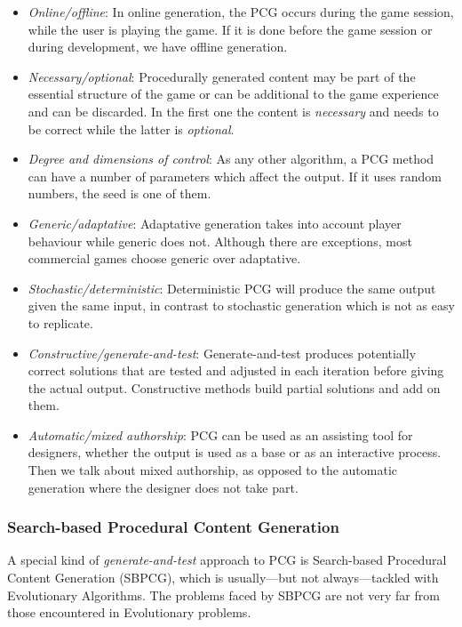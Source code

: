 \begin{itemize}
	\item \textit{Online/offline}: In online generation, the PCG occurs during the game session, while the user is playing the game. If it is done before the game session or during development, we have offline generation. 
	\item \textit{Necessary/optional}: Procedurally generated content may be part of the essential structure of the game or can be additional to the game experience and can be discarded. In the first one the content is \textit{necessary} and needs to be correct while the latter is \textit{optional}.
	\item \textit{Degree and dimensions of control}: As any other algorithm, a PCG method can have a number of parameters which affect the output. If it uses random numbers, the seed is one of them.
	\item \textit{Generic/adaptative}: Adaptative generation takes into account player behaviour while generic does not. Although there are exceptions, most commercial games choose generic over adaptative.
	\item \textit{Stochastic/deterministic}: Deterministic PCG will produce the same output given the same input, in contrast to stochastic generation which is not as easy to replicate. 
	\item \textit{Constructive/generate-and-test}: Generate-and-test produces potentially correct solutions that are tested and adjusted in each iteration before giving the actual output. Constructive methods build partial solutions and add on them.
	\item \textit{Automatic/mixed authorship}: PCG can be used as an assisting tool for designers, whether the output is used as a base or as an interactive process. Then we talk about mixed authorship, as opposed to the automatic generation where the designer does not take part. 
\end{itemize}

\subsubsection{Search-based Procedural Content Generation}

A special kind of \textit{generate-and-test} approach to PCG is Search-based Procedural Content Generation (SBPCG), which is usually---but not always---tackled with Evolutionary Algorithms. The problems faced by SBPCG are not very far from those encountered in Evolutionary problems. 

